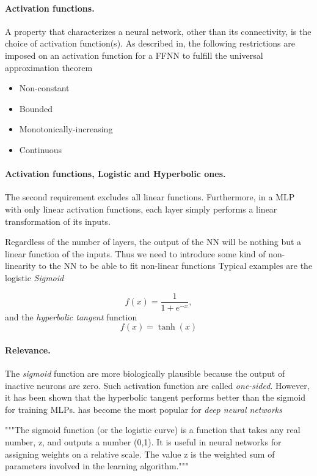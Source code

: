 \documentclass[%
oneside,                 %
final,                   %
10pt]{article}
\begin{document}
\paragraph{Activation functions.}
A property that characterizes a neural network, other than its
connectivity, is the choice of activation function(s).  As described
in, the following restrictions are imposed on an activation function
for a FFNN to fulfill the universal approximation theorem

\begin{itemize}
  \item Non-constant

  \item Bounded

  \item Monotonically-increasing

  \item Continuous
\end{itemize}

\noindent
\paragraph{Activation functions, Logistic and Hyperbolic ones.}
The second requirement excludes all linear functions. Furthermore, in
a MLP with only linear activation functions, each layer simply
performs a linear transformation of its inputs.

Regardless of the number of layers, the output of the NN will be
nothing but a linear function of the inputs. Thus we need to introduce
some kind of non-linearity to the NN to be able to fit non-linear
functions Typical examples are the logistic \emph{Sigmoid}

\[
 f(x) = \frac{1}{1 + e^{-x}},
\]
and the \emph{hyperbolic tangent} function
\[
 f(x) = \tanh(x)
\]

\paragraph{Relevance.}
The \emph{sigmoid} function are more biologically plausible because the
output of inactive neurons are zero. Such activation function are
called \emph{one-sided}. However, it has been shown that the hyperbolic
tangent performs better than the sigmoid for training MLPs.  has
become the most popular for \emph{deep neural networks}

\bpycod
"""The sigmoid function (or the logistic curve) is a 
function that takes any real number, z, and outputs a number (0,1).
It is useful in neural networks for assigning weights on a relative scale.
The value z is the weighted sum of parameters involved in the learning algorithm."""
\end{document}
